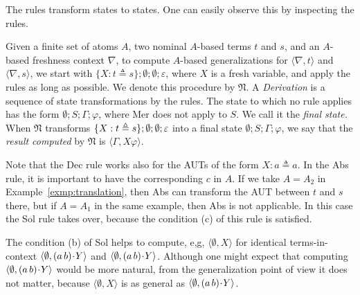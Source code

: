 \documentclass[11pt,a4paper]{amsart}
\theoremstyle{definition}
\newcommand{\frN}{\mathfrak N}
\newcommand{\swap}[2]{\ensuremath{(#1\, #2)}}
\newcommand{\permap}{{\mkern 1mu\cdot \mkern 1mu}}
\newcommand{\ids}{\varepsilon}
\newcommand{\np}[2]{\langle #1, \allowbreak #2\rangle}
\newcommand{\Atoms}{A}
\newcommand{\nablai}{{\nabla}}
\newcommand{\nablag}{\Gamma}
\begin{document}
The rules transform states to states. One can easily observe this by inspecting the rules. 

Given a finite set of atoms $\Atoms$, two nominal $\Atoms$-based terms
$ t$ and $ s$, and an $\Atoms$-based freshness context $\nablai$, to
compute $\Atoms$-based generalizations for
$\np{\nablai}{t}$ and $\np{\nablai}{s}$, we start with $\{{ X : t
  \triangleq s}\}; \emptyset; \emptyset; \ids$, where $ X$ is a fresh
variable, and apply the rules as long as possible.  We denote this
procedure by $\frN$. A \emph{Derivation} is a sequence of state transformations by the rules. The state to which no rule applies has the form
$\emptyset; S; \nablag; \varphi$, where \textsf{Mer} does not apply to
$S$. We call it the \emph{final state.} When $\frN$ transforms $\{ X : t
\triangleq\penalty 10000 s\}; \emptyset; \emptyset; \ids$ into a final
state $\emptyset; S; { \nablag;} \varphi$, we say that the
\emph{result computed} by $\frN$ is $\np{\nablag}{X\varphi}$.

Note that the {\sf Dec} rule works also for the AUTs of the form
$X:a\triangleq a$. In the {\sf Abs} rule, it is important to have the
corresponding $c$ in $\Atoms$. If we take $\Atoms=A_2$ in
Example~\ref{exmp:translation}, then {\sf Abs} can transform the AUT
between $t$ and $s$ there, but if $\Atoms=A_1$ in the same example,
then {\sf Abs} is not applicable. In this case the {\sf Sol} rule
takes over, because the condition (c) of this rule is satisfied.

The condition (b) of {\sf Sol} helps to compute, e,g,
$\np{\emptyset}{X}$ for identical terms-in-context
$\np{\emptyset}{\swap{a}{b}\permap Y}$ and $\np{\emptyset}{\swap{a}{b}\permap
  Y}$. Although one might expect that computing
$\np{\emptyset}{\swap{a}{b}\permap Y}$ would be more natural, from the
generalization point of view it does not matter, because
$\np{\emptyset}{X}$ is as general as $\np{\emptyset}{\swap{a}{b}\permap Y}$.
\end{document}
